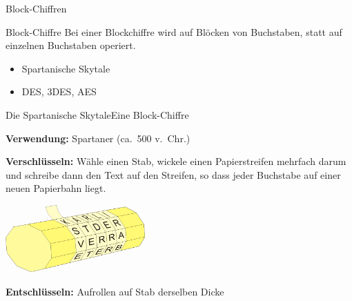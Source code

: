 \documentclass{beamer}
\theoremstyle{plain}
\begin{document}
 \begin{frame}{Block-Chiffren}{~}
 
 \begin{block}{Block-Chiffre}
 Bei einer Blockchiffre wird auf Blöcken von Buchstaben, statt auf einzelnen Buchstaben operiert.
 \end{block}
 
 \vspace{0.5cm}
 
 \begin{itemize}
  \item Spartanische Skytale
  \item DES, $3$DES, AES
 \end{itemize}

 \end{frame}

 \begin{frame}{Die Spartanische Skytale}{Eine Block-Chiffre}
 
 \textbf{Verwendung:} Spartaner (ca.~500 v.~Chr.) \pause
 
 \vspace{0.5cm}
 \textbf{Verschlüsseln:} Wähle einen Stab, wickele einen Papierstreifen mehrfach darum und schreibe dann den Text auf den Streifen, so dass jeder Buchstabe auf einer neuen Papierbahn liegt.
 \begin{center}
  \includegraphics[width=0.4\textwidth]{skytale}
 \end{center}
\vspace{0.5cm} \pause
\textbf{Entschlüsseln:} Aufrollen auf Stab derselben Dicke
 \end{frame}
\end{document}
